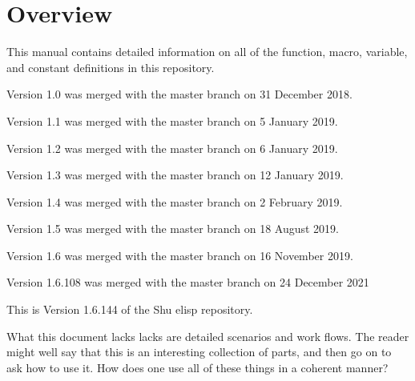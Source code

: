 




\section{Overview}


This manual contains detailed information on all of the function, macro,
variable, and constant definitions in this repository.

Version 1.0 was merged with the master branch on 31 December 2018.

Version 1.1 was merged with the master branch on 5 January 2019.

Version 1.2 was merged with the master branch on 6 January 2019.

Version 1.3 was merged with the master branch on 12 January 2019.

Version 1.4 was merged with the master branch on 2 February 2019.

Version 1.5 was merged with the master branch on 18 August 2019.

Version 1.6 was merged with the master branch on 16 November 2019.

Version 1.6.108 was merged with the master branch on 24 December 2021

This is Version 1.6.144 of the Shu elisp repository.

What this document lacks lacks are detailed scenarios and work flows.  The
reader might well say that this is an interesting collection of parts, and
then go on to ask how to use it.  How does one use all of these things in a
coherent manner?

